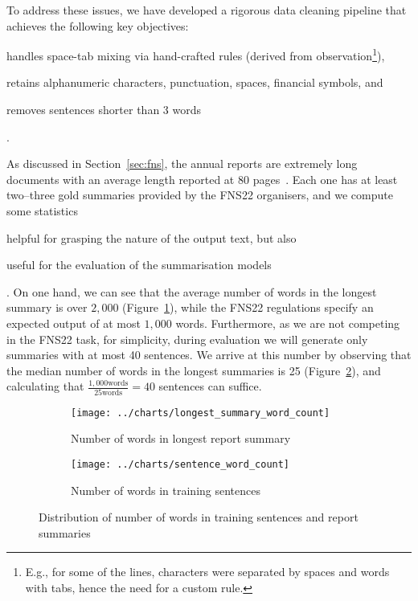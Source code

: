 To address these issues, we have developed a rigorous data cleaning pipeline that achieves the following key objectives:
\begin{enumerate*}[label=(\alph*)]
    \item handles space-tab mixing via hand-crafted rules (derived from observation\footnote{
      E.g., for some of the lines, characters were separated by spaces and words with tabs, hence the need for a custom rule.
    }),
    \item retains alphanumeric characters, punctuation, spaces, financial symbols, and
    \item removes sentences shorter than 3 words
\end{enumerate*}.

As discussed in Section~\ref{sec:fns}, the annual reports are extremely long documents with an average length reported at 80 pages~\cite{litvak-vanetik-2021-summarization}.
Each one has at least two--three gold summaries provided by the FNS22 organisers, and we compute some statistics
\begin{enumerate*}[label=(\alph*)]
    \item helpful for grasping the nature of the output text, but also
    \item useful for the evaluation of the summarisation models
\end{enumerate*}.
On one hand, we can see that the average number of words in the longest summary is over $2,000$ (Figure~\ref{fig:longest_summary_word_count}), while the FNS22 regulations specify an expected output of at most $1,000$ words.
Furthermore, as we are not competing in the FNS22 task, for simplicity, during evaluation we will generate only summaries with at most 40 sentences.
We arrive at this number by observing that the median number of words in the longest summaries is 25 (Figure~\ref{fig:sentence_word_count}), and calculating that $\frac{1,000\text{words}}{25\text{words}}=40$ sentences can suffice.

\begin{figure}[ht]
    \begin{subfigure}{0.49\textwidth}
        \centering        \texttt{[image: ../charts/longest\_summary\_word\_count]}
        \caption{Number of words in longest report summary}
        \label{fig:longest_summary_word_count}
    \end{subfigure}%
    \hfill
    \begin{subfigure}{0.49\textwidth}
        \centering
        \texttt{[image: ../charts/sentence\_word\_count]}
        \caption{Number of words in training sentences}
        \label{fig:sentence_word_count}
    \end{subfigure}
    \caption{Distribution of number of words in training sentences and report summaries}
    \label{fig:word_count}
\end{figure}

